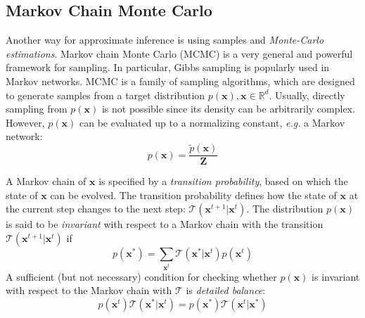 \subsection{Markov Chain Monte Carlo}
Another way for approximate inference is using samples and \emph{Monte-Carlo estimations}.      
Markov chain Monte Carlo (MCMC) is a very general and powerful framework for sampling. In particular, Gibbs sampling is popularly used in Markov networks.    
MCMC is a family of sampling algorithms, which are designed to generate samples from a target distribution $p(\mathbf{x}), \mathbf{x}\in\mathbb{R}^d$. 
Usually, directly sampling from $p(\mathbf{x})$ is not possible since its density can be arbitrarily complex. However, $p(\mathbf{x})$ can be evaluated up to a normalizing constant, \emph{e.g.} a 
Markov network:
\begin{equation*}
	p(\mathbf{x})=\frac{\tilde{p}(\mathbf{x})}{\mathbf{Z}}
\end{equation*}

A Markov chain of $\mathbf{x}$ is specified by a \emph{transition probability}, based on which the state of $\mathbf{x}$ can 
be evolved. The transition probability defines how the state of $\mathbf{x}$ at the current step changes to the next step: $\mathcal{T}(\mathbf{x}^{t+1}|\mathbf{x}^t)$.      
The distribution $p(\mathbf{x})$ is said to be \emph{invariant} with respect to a Markov chain with the transition  $\mathcal{T}(\mathbf{x}^{t+1}|\mathbf{x}^t)$ if
\begin{equation}
	p(\mathbf{x}^*)=\sum_{\mathbf{x}^t}\mathcal{T}(\mathbf{x}^*|\mathbf{x}^t)p(\mathbf{x}^t)
\end{equation}
A sufficient (but not necessary) condition for checking whether $p(\mathbf{x})$ is invariant with respect to the Markov chain with $\mathcal{T}$ is \emph{detailed balance}:
\begin{equation}
  p(\mathbf{x}^t) \mathcal{T}(\mathbf{x}^*|\mathbf{x}^t)=p(\mathbf{x}^*) \mathcal{T}(\mathbf{x}^t|\mathbf{x}^*)
\end{equation}
